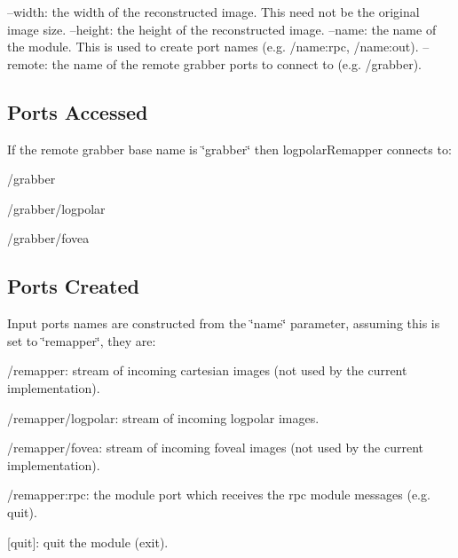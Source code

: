 \begin{DoxyCode}
--width: the width of the reconstructed image. This need not be the original image size.
--height: the height of the reconstructed image.
--name: the name of the module. This is used to create port names (e.g. /name:rpc, /name:out).
--remote: the name of the remote grabber ports to connect to (e.g. /grabber).
\end{DoxyCode}
\hypertarget{group__icub__logpolarTransform_portsa_sec}{}\subsection{Ports Accessed}\label{group__icub__logpolarTransform_portsa_sec}
If the remote grabber base name is \char`\"{}grabber\char`\"{} then logpolar\+Remapper connects to\+:
\begin{DoxyItemize}
\item /grabber
\item /grabber/logpolar
\item /grabber/fovea
\end{DoxyItemize}\hypertarget{group__icub__logpolarTransform_portsc_sec}{}\subsection{Ports Created}\label{group__icub__logpolarTransform_portsc_sec}
Input ports names are constructed from the \char`\"{}name\char`\"{} parameter, assuming this is set to \char`\"{}remapper\char`\"{}, they are\+:
\begin{DoxyItemize}
\item /remapper\+: stream of incoming cartesian images (not used by the current implementation).
\item /remapper/logpolar\+: stream of incoming logpolar images.
\item /remapper/fovea\+: stream of incoming foveal images (not used by the current implementation).
\item /remapper\+:rpc\+: the module port which receives the rpc module messages (e.\+g. quit).
\begin{DoxyItemize}
\item \mbox{[}quit\mbox{]}\+: quit the module (exit).
\end{DoxyItemize}
\end{DoxyItemize}

